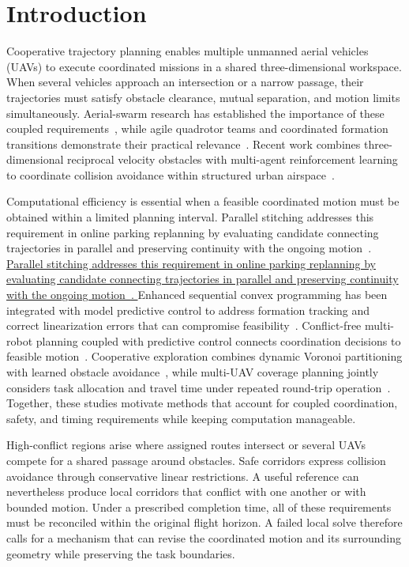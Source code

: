 \documentclass[electronics,article,submit,moreauthors]{Definitions/mdpi}
\providecommand{\DIFadd}[1]{{\protect\color{RevisionBlue}\ifmmode #1\else\uline{#1}\fi}} %
\providecommand{\DIFaddbegin}{}\providecommand{\DIFaddend}{} %
\begin{document}
\section{Introduction}

Cooperative trajectory planning enables multiple unmanned aerial vehicles (UAVs) to execute coordinated missions in a shared three-dimensional workspace. When several vehicles approach an intersection or a narrow passage, their trajectories must satisfy obstacle clearance, mutual separation, and motion limits simultaneously. Aerial-swarm research has established the importance of these coupled requirements~\mbox{\cite{chung2018}}, while agile quadrotor teams and coordinated formation transitions demonstrate their practical relevance~\mbox{\cite{kushleyev2012,preiss2017}}. Recent work combines three-dimensional reciprocal velocity obstacles with multi-agent reinforcement learning to coordinate collision avoidance within structured urban airspace~\mbox{\cite{zhong2025rvo}}.

Computational efficiency is essential when a feasible coordinated motion must be obtained within a limited planning interval. \DIFaddbegin \DIFadd{Parallel stitching addresses this requirement in online parking replanning by evaluating candidate connecting trajectories in parallel and preserving continuity with the ongoing motion~\mbox{\cite{li2022stitching}}. }\DIFaddend Enhanced sequential convex programming has been integrated with model predictive control to address formation tracking and correct linearization errors that can compromise feasibility~\mbox{\cite{liu2025escp}}. Conflict-free multi-robot planning coupled with predictive control connects coordination decisions to feasible motion~\mbox{\cite{wu2025conflict}}. Cooperative exploration combines dynamic Voronoi partitioning with learned obstacle avoidance~\mbox{\cite{zhao2025exploration}}, while multi-UAV coverage planning jointly considers task allocation and travel time under repeated round-trip operation~\mbox{\cite{li2025coverage}}. Together, these studies motivate methods that account for coupled coordination, safety, and timing requirements while keeping computation manageable.

High-conflict regions arise where assigned routes intersect or several UAVs compete for a shared passage around obstacles. Safe corridors express collision avoidance through conservative linear restrictions. A useful reference can nevertheless produce local corridors that conflict with one another or with bounded motion. Under a prescribed completion time, all of these requirements must be reconciled within the original flight horizon. A failed local solve therefore calls for a mechanism that can revise the coordinated motion and its surrounding geometry while preserving the task boundaries.
\end{document}
